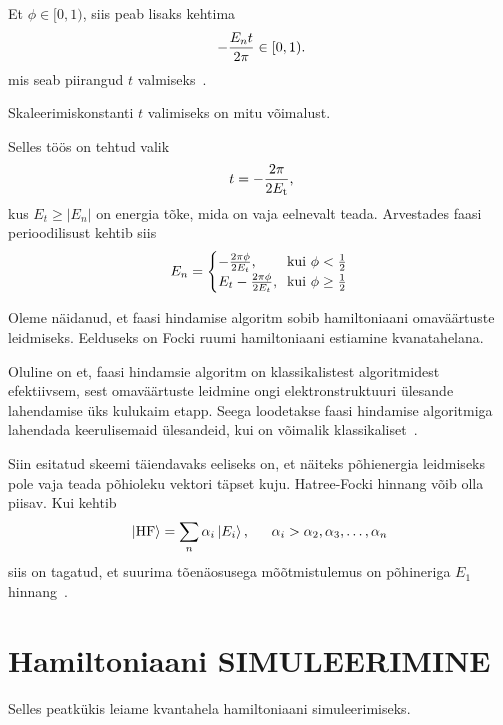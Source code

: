 \documentclass[12pt]{report}
\def\abs#1{\left|#1\right|}
\def\ket#1{\mathinner{|#1\rangle}}
\begin{document}
Et \(\phi \in [0, 1)\), siis peab lisaks kehtima
\begin{align}
    -\frac{E_n t}{2\pi} \in [0, 1) \rlap{.}
\end{align}
mis seab piirangud \(t\) valmiseks~\cite{whitfield+etal}.

Skaleerimiskonstanti \(t\) valimiseks on mitu võimalust.

Selles töös on tehtud valik
\begin{align}
    t = -\frac{2\pi}{2E_\mathrm{t}} \rlap{,}
\end{align}
kus \(E_t \ge \abs{E_n}\) on energia tõke, mida on vaja eelnevalt teada.
Arvestades faasi perioodilisust kehtib siis
\begin{align}
    E_n = \begin{cases}
        -\frac{2\pi\phi}{2E_t}\rlap{,} & \text{kui } \phi < \frac{1}{2} \\
        E_t - \frac{2\pi\phi}{2E_t}\rlap{,} & \text{kui } \phi \ge \frac{1}{2} \\
    \end{cases}
\end{align}

Oleme näidanud, et faasi hindamise algoritm sobib hamiltoniaani omaväärtuste leidmiseks.
Eelduseks on Focki ruumi hamiltoniaani estiamine kvanatahelana.

Oluline on et, faasi hindamsie algoritm on klassikalistest algoritmidest efektiivsem, sest omaväärtuste leidmine ongi elektronstruktuuri ülesande lahendamise üks kulukaim etapp.
Seega loodetakse faasi hindamise algoritmiga lahendada keerulisemaid ülesandeid, kui on võimalik klassikaliset~\cite{mcardle+etal, cao+etal}.

Siin esitatud skeemi täiendavaks eeliseks on, et näiteks põhienergia leidmiseks pole vaja teada põhioleku vektori täpset kuju.
Hatree-Focki hinnang võib olla piisav.
Kui kehtib
\begin{align}
    \ket{\text{HF}} = \sum_n \alpha_i \ket{E_i} \rlap{,}
    \qquad \alpha_i > \alpha_2, \alpha_3, \ldots, \alpha_n
\end{align}
siis on tagatud, et suurima tõenäosusega mõõtmistulemus on põhineriga \(E_1\) hinnang~\cite{whitfield+etal}.


\section{Hamiltoniaani SIMULEERIMINE}

Selles peatkükis leiame kvantahela hamiltoniaani simuleerimiseks.
\end{document}
